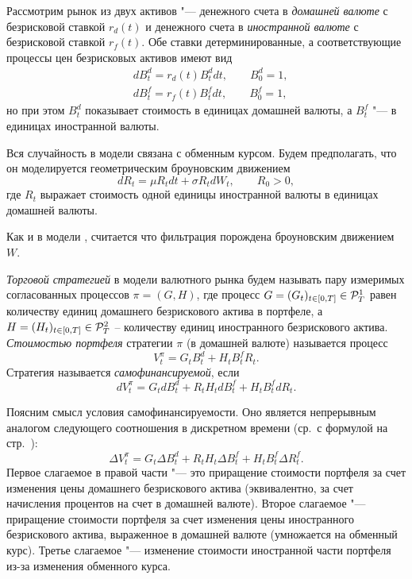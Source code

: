 Рассмотрим рынок из двух активов "--- денежного счета в \emph{домашней валюте} с безрисковой ставкой $r_d(t)$ и денежного счета в \emph{иностранной валюте} с безрисковой ставкой $r_f(t)$.
Обе ставки детерминированные, а соответствующие процессы цен безрисковых активов имеют вид
\begin{align*}
&d B_t^d = r_d(t) B_t^d dt, \qquad B_0^d = 1,\\
&d B_t^f = r_f(t) B_t^f dt, \qquad B_0^f = 1,
\end{align*}
но при этом $B_t^d$ показывает стоимость в единицах домашней валюты, а $B_t^f$ "--- в единицах иностранной валюты.

Вся случайность в модели связана с обменным курсом.
Будем предполагать, что он моделируется геометрическим броуновским движением
\[
d R_t = \mu R_t dt + \sigma R_t d W_t, \qquad R_0>0,
\]
где $R_t$ выражает стоимость одной единицы иностранной валюты в единицах домашней валюты. 

Как и в модели \bs, считается что фильтрация порождена броуновским движением $W$. 

\begin{definition}
\emph{Торговой стратегией} в модели валютного рынка будем называть пару измеримых согласованных процессов $\pi=(G,H)$, где процесс $G=(G_t)_{t\in[0,T]} \in \mathcal{P}^1_T$ равен количеству единиц домашнего безрискового актива в портфеле, а $H=(H_t)_{t\in[0,T]} \in \mathcal{P}^2_T$ -- количеству единиц иностранного безрискового актива. 
\emph{Стоимостью портфеля} стратегии $\pi$ (в домашней валюте) называется процесс 
\[
V_t^\pi = G_t B_t^d + H_t B_t^f R_t.
\]
Стратегия называется \emph{самофинансируемой}, если 
\begin{equation}
\label{10:forex-sf}
d V_t^\pi = G_t d B_t^d + R_t H_t d B_t^f + H_t B_t^f dR_t.
\end{equation}
\end{definition}

Поясним смысл условия самофинансируемости.
Оно является непрерывным аналогом следующего соотношения в дискретном времени (ср.~с формулой на стр.~\pageref{9:self-financing-discrete}):
\[
\Delta V_t^\pi = G_t \Delta B_t^d + R_t H_t\Delta B_t^f + H_tB_t^f\Delta R_t^f.
\]
Первое слагаемое в правой части "--- это приращение стоимости портфеля за счет изменения цены домашнего безрискового актива (эквивалентно, за счет начисления процентов на счет в домашней валюте).
Второе слагаемое "--- приращение стоимости портфеля за счет изменения цены иностранного безрискового актива, выраженное в домашней валюте (умножается на обменный курс).
Третье слагаемое "--- изменение стоимости иностранной части портфеля из-за изменения обменного курса.

